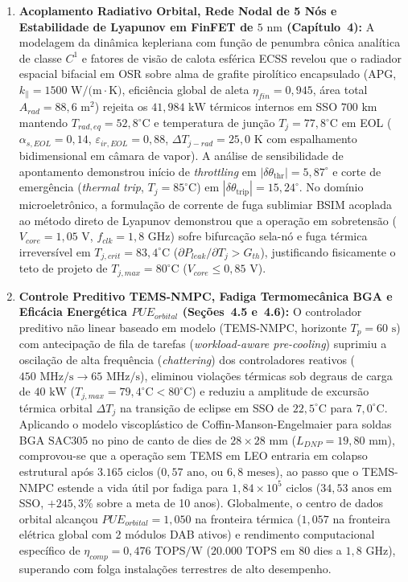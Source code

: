 \begin{enumerate}[label=\textbf{\arabic*.},leftmargin=*]
    \item \textbf{Acoplamento Radiativo Orbital, Rede Nodal de 5 Nós e Estabilidade de Lyapunov em FinFET de $5\text{ nm}$ (Capítulo~4):} A modelagem da dinâmica kepleriana com função de penumbra cônica analítica de classe $C^1$ e fatores de visão de calota esférica ECSS revelou que o radiador espacial bifacial em OSR sobre alma de grafite pirolítico encapsulado ($\text{APG}$, $k_{\parallel} = 1500\text{ W/(m}\cdot\text{K)}$, eficiência global de aleta $\eta_{fin} = 0{,}945$, área total $A_{rad} = 88{,}6\text{ m}^2$) rejeita os $41{,}984\text{ kW}$ térmicos internos em SSO $700\text{ km}$ mantendo $T_{rad,eq} = 52{,}8^\circ\text{C}$ e temperatura de junção $T_j = 77{,}8^\circ\text{C}$ em EOL ($\alpha_{s,EOL} = 0{,}14$, $\varepsilon_{ir,EOL} = 0{,}88$, $\Delta T_{j-rad} = 25{,}0\text{ K}$ com espalhamento bidimensional em câmara de vapor). A análise de sensibilidade de apontamento demonstrou início de \textit{throttling} em $|\delta\theta_{\text{thr}}| = 5{,}87^\circ$ e corte de emergência (\textit{thermal trip}, $T_j = 85^\circ\text{C}$) em $|\delta\theta_{\text{trip}}| = 15{,}24^\circ$. No domínio microeletrônico, a formulação de corrente de fuga sublimiar BSIM acoplada ao método direto de Lyapunov demonstrou que a operação em sobretensão ($V_{core} = 1{,}05\text{ V}$, $f_{clk} = 1{,}8\text{ GHz}$) sofre bifurcação sela-nó e fuga térmica irreversível em $T_{j,crit} = 83{,}4^\circ\text{C}$ ($\partial P_{leak}/\partial T_j > G_{th}$), justificando fisicamente o teto de projeto de $T_{j,max} = 80^\circ\text{C}$ ($V_{core} \le 0{,}85\text{ V}$).
    \item \textbf{Controle Preditivo TEMS-NMPC, Fadiga Termomecânica BGA e Eficácia Energética $PUE_{orbital}$ (Seções~4.5 e~4.6):} O controlador preditivo não linear baseado em modelo (TEMS-NMPC, horizonte $T_p = 60\text{ s}$) com antecipação de fila de tarefas (\textit{workload-aware pre-cooling}) suprimiu a oscilação de alta frequência (\textit{chattering}) dos controladores reativos ($450\text{ MHz/s} \rightarrow 65\text{ MHz/s}$), eliminou violações térmicas sob degraus de carga de $40\text{ kW}$ ($T_{j,max} = 79{,}4^\circ\text{C} < 80^\circ\text{C}$) e reduziu a amplitude de excursão térmica orbital $\Delta T_j$ na transição de eclipse em SSO de $22{,}5^\circ\text{C}$ para $7{,}0^\circ\text{C}$. Aplicando o modelo viscoplástico de Coffin-Manson-Engelmaier para soldas BGA $\text{SAC305}$ no pino de canto de dies de $28 \times 28\text{ mm}$ ($L_{DNP} = 19{,}80\text{ mm}$), comprovou-se que a operação sem TEMS em LEO entraria em colapso estrutural após $3.165\text{ ciclos}$ ($0{,}57\text{ ano}$, ou $6{,}8\text{ meses}$), ao passo que o TEMS-NMPC estende a vida útil por fadiga para $1{,}84 \times 10^5\text{ ciclos}$ ($34{,}53\text{ anos}$ em SSO, $+245{,}3\%$ sobre a meta de 10 anos). Globalmente, o centro de dados orbital alcançou $PUE_{orbital} = 1{,}050$ na fronteira térmica ($1{,}057$ na fronteira elétrica global com 2 módulos DAB ativos) e rendimento computacional específico de $\eta_{comp} = 0{,}476\text{ TOPS/W}$ ($20.000\text{ TOPS}$ em 80 dies a $1{,}8\text{ GHz}$), superando com folga instalações terrestres de alto desempenho.
\end{enumerate}

